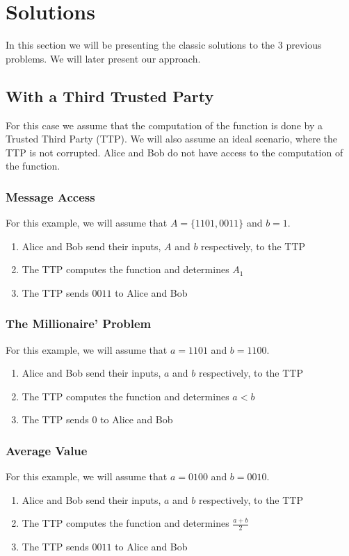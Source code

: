 \section{Solutions}
In this section we will be presenting the classic solutions to the 3 previous problems. We will later present our approach.
\subsection{With a Third Trusted Party}
For this case we assume that the computation of the function is done by a Trusted Third Party (TTP).
We will also assume an ideal scenario, where the TTP is not corrupted.
Alice and Bob do not have access to the computation of the function.

\subsubsection{Message Access}
For this example, we will assume that $A = \{1101,0011\}$ and $b = 1$.
\begin{enumerate}
\item Alice and Bob send their inputs, $A$ and $b$ respectively, to the TTP
\item The TTP computes the function and determines $A_1$
\item The TTP sends $0011$ to Alice and Bob
\end{enumerate}

\subsubsection{The Millionaire' Problem}
For this example, we will assume that $a = 1101$ and $b = 1100$.
\begin{enumerate}
\item Alice and Bob send their inputs, $a$ and $b$ respectively, to the TTP
\item The TTP computes the function and determines $a < b$
\item The TTP sends $0$ to Alice and Bob
\end{enumerate}

\subsubsection{Average Value}
For this example, we will assume that $a = 0100$ and $b = 0010$.
\begin{enumerate}
\item Alice and Bob send their inputs, $a$ and $b$ respectively, to the TTP
\item The TTP computes the function and determines $\frac{a+b}{2}$
\item The TTP sends $0011$ to Alice and Bob
\end{enumerate}


